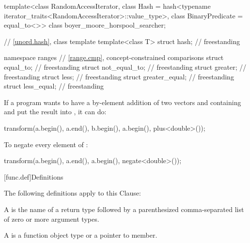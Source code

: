 \begin{codeblock}
{  template<class RandomAccessIterator,
           class Hash = hash<typename iterator_traits<RandomAccessIterator>::value_type>,
           class BinaryPredicate = equal_to<>>
    class boyer_moore_horspool_searcher;

  // \ref{unord.hash}, class template 
  template<class T>
    struct hash;                                                                    // freestanding

  namespace ranges {
    // \ref{range.cmp}, concept-constrained comparisons
    struct equal_to;                                                                // freestanding
    struct not_equal_to;                                                            // freestanding
    struct greater;                                                                 // freestanding
    struct less;                                                                    // freestanding
    struct greater_equal;                                                           // freestanding
    struct less_equal;                                                              // freestanding
  }
}
\end{codeblock}

\pnum
\begin{example}
If a \Cpp{} program wants to have a by-element addition of two vectors 
and  containing  and put the result into ,
it can do:

\begin{codeblock}
transform(a.begin(), a.end(), b.begin(), a.begin(), plus<double>());
\end{codeblock}
\end{example}

\pnum
\begin{example}
To negate every element of :

\begin{codeblock}
transform(a.begin(), a.end(), a.begin(), negate<double>());
\end{codeblock}

\end{example}

[func.def]{Definitions}

\pnum
The following definitions apply to this Clause:

\pnum
A  is the name of a return type followed by a
parenthesized comma-separated list of zero or more argument types.

\pnum
A  is a function object type or a pointer to member.

